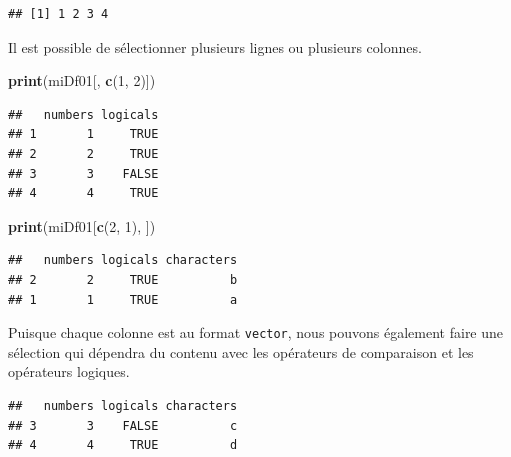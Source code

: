\documentclass[]{book}
\newenvironment{Shaded}{\begin{snugshade}}{\end{snugshade}}
\newcommand{\KeywordTok}[1]{\textcolor[rgb]{0.13,0.29,0.53}{\textbf{#1}}}
\newcommand{\DecValTok}[1]{\textcolor[rgb]{0.00,0.00,0.81}{#1}}
\newcommand{\StringTok}[1]{\textcolor[rgb]{0.31,0.60,0.02}{#1}}
\newcommand{\OtherTok}[1]{\textcolor[rgb]{0.56,0.35,0.01}{#1}}
\newcommand{\OperatorTok}[1]{\textcolor[rgb]{0.81,0.36,0.00}{\textbf{#1}}}
\newcommand{\NormalTok}[1]{#1}
\begin{document}
\begin{verbatim}
## [1] 1 2 3 4
\end{verbatim}

Il est possible de sélectionner plusieurs lignes ou plusieurs colonnes.

\begin{Shaded}
\begin{Highlighting}[]
\KeywordTok{print}\NormalTok{(miDf01[, }\KeywordTok{c}\NormalTok{(}\DecValTok{1}\NormalTok{, }\DecValTok{2}\NormalTok{)])}
\end{Highlighting}
\end{Shaded}

\begin{verbatim}
##   numbers logicals
## 1       1     TRUE
## 2       2     TRUE
## 3       3    FALSE
## 4       4     TRUE
\end{verbatim}

\begin{Shaded}
\begin{Highlighting}[]
\KeywordTok{print}\NormalTok{(miDf01[}\KeywordTok{c}\NormalTok{(}\DecValTok{2}\NormalTok{, }\DecValTok{1}\NormalTok{), ])}
\end{Highlighting}
\end{Shaded}

\begin{verbatim}
##   numbers logicals characters
## 2       2     TRUE          b
## 1       1     TRUE          a
\end{verbatim}

Puisque chaque colonne est au format \texttt{vector}, nous pouvons
également faire une sélection qui dépendra du contenu avec les
opérateurs de comparaison et les opérateurs logiques.

\begin{Shaded}
\end{Shaded}

\begin{verbatim}
##   numbers logicals characters
## 3       3    FALSE          c
## 4       4     TRUE          d
\end{verbatim}

\begin{Shaded}
\end{Shaded}
\end{document}
